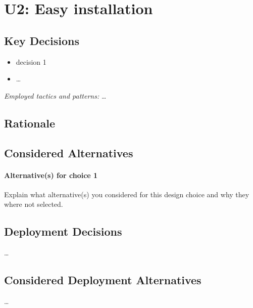 \section{U2: Easy installation}


    \subsection*{Key Decisions}


        \begin{itemize}
        	\item decision 1
        	\item \ldots
        \end{itemize}
        \emph{Employed tactics and patterns:} \ldots

    \subsection*{Rationale}

    \subsection*{Considered Alternatives}
        \paragraph{Alternative(s) for choice 1} Explain what alternative(s) you
        considered for this design choice and why they where not selected.

    \subsection*{Deployment Decisions}
        \ldots

    \subsection*{Considered Deployment Alternatives}
        \ldots
